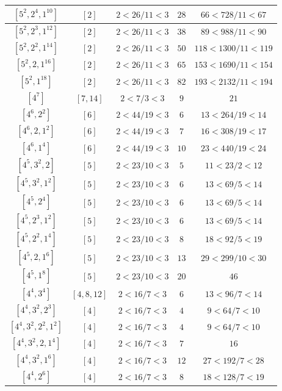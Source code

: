\documentclass{article}%
\begin{document}
\begin{center}
\begin{longtable}{||c|c|c|c|c||}
$[5^{2}, 2^{4}, 1^{10}]$ & $[2]$ & $2 < 26/11 < 3$ & $28$ & $66 < 728/11 < 67$ \\ \hline 
$[5^{2}, 2^{3}, 1^{12}]$ & $[2]$ & $2 < 26/11 < 3$ & $38$ & $89 < 988/11 < 90$ \\ \hline 
$[5^{2}, 2^{2}, 1^{14}]$ & $[2]$ & $2 < 26/11 < 3$ & $50$ & $118 < 1300/11 < 119$ \\ \hline 
$[5^{2}, 2, 1^{16}]$ & $[2]$ & $2 < 26/11 < 3$ & $65$ & $153 < 1690/11 < 154$ \\ \hline 
$[5^{2}, 1^{18}]$ & $[2]$ & $2 < 26/11 < 3$ & $82$ & $193 < 2132/11 < 194$ \\ \hline 
$[4^{7}]$ & $[7, 14]$ & $2 < 7/3 < 3$ & $9$ & $21$ \\ \hline 
$[4^{6}, 2^{2}]$ & $[6]$ & $2 < 44/19 < 3$ & $6$ & $13 < 264/19 < 14$ \\ \hline 
$[4^{6}, 2, 1^{2}]$ & $[6]$ & $2 < 44/19 < 3$ & $7$ & $16 < 308/19 < 17$ \\ \hline 
$[4^{6}, 1^{4}]$ & $[6]$ & $2 < 44/19 < 3$ & $10$ & $23 < 440/19 < 24$ \\ \hline 
$[4^{5}, 3^{2}, 2]$ & $[5]$ & $2 < 23/10 < 3$ & $5$ & $11 < 23/2 < 12$ \\ \hline 
$[4^{5}, 3^{2}, 1^{2}]$ & $[5]$ & $2 < 23/10 < 3$ & $6$ & $13 < 69/5 < 14$ \\ \hline 
$[4^{5}, 2^{4}]$ & $[5]$ & $2 < 23/10 < 3$ & $6$ & $13 < 69/5 < 14$ \\ \hline 
$[4^{5}, 2^{3}, 1^{2}]$ & $[5]$ & $2 < 23/10 < 3$ & $6$ & $13 < 69/5 < 14$ \\ \hline 
$[4^{5}, 2^{2}, 1^{4}]$ & $[5]$ & $2 < 23/10 < 3$ & $8$ & $18 < 92/5 < 19$ \\ \hline 
$[4^{5}, 2, 1^{6}]$ & $[5]$ & $2 < 23/10 < 3$ & $13$ & $29 < 299/10 < 30$ \\ \hline 
$[4^{5}, 1^{8}]$ & $[5]$ & $2 < 23/10 < 3$ & $20$ & $46$ \\ \hline 
$[4^{4}, 3^{4}]$ & $[4, 8, 12]$ & $2 < 16/7 < 3$ & $6$ & $13 < 96/7 < 14$ \\ \hline 
$[4^{4}, 3^{2}, 2^{3}]$ & $[4]$ & $2 < 16/7 < 3$ & $4$ & $9 < 64/7 < 10$ \\ \hline 
$[4^{4}, 3^{2}, 2^{2}, 1^{2}]$ & $[4]$ & $2 < 16/7 < 3$ & $4$ & $9 < 64/7 < 10$ \\ \hline 
$[4^{4}, 3^{2}, 2, 1^{4}]$ & $[4]$ & $2 < 16/7 < 3$ & $7$ & $16$ \\ \hline 
$[4^{4}, 3^{2}, 1^{6}]$ & $[4]$ & $2 < 16/7 < 3$ & $12$ & $27 < 192/7 < 28$ \\ \hline 
$[4^{4}, 2^{6}]$ & $[4]$ & $2 < 16/7 < 3$ & $8$ & $18 < 128/7 < 19$ \\ \hline 

\end{longtable}
\end{center}
\end{document}
